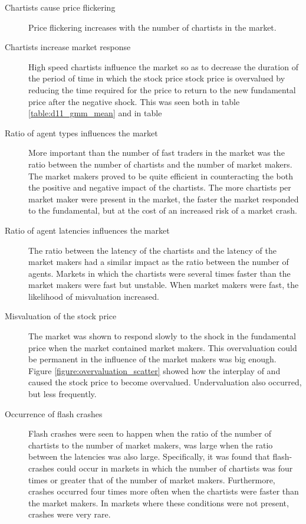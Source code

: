 \begin{description}
\item[Chartists cause price flickering] Price flickering increases with the number of chartists in the market.

\item[Chartists increase market response] High speed chartists influence the market so as to decrease the duration of the period of time in which the stock price stock price is overvalued by reducing the time required for the price to return to the new fundamental price after the negative shock. This was seen both in table \ref{table:d11_gmm_mean} and in table 

\item[Ratio of agent types influences the market] More important than the number of fast traders in the market was the ratio between the number of chartists and the number of market makers. The market makers proved to be quite efficient in counteracting the both the positive and negative impact of the chartists. The more chartists per market maker were present in the market, the faster the market responded to the fundamental, but at the cost of an increased risk of a market crash.
\item[Ratio of agent latencies influences the market] The ratio between the latency of the chartists and the latency of the market makers had a similar impact as the ratio between the number of agents. Markets in which the chartists were several times faster than the market makers were fast but unstable. When market makers were fast, the likelihood of misvaluation increased.

\item[Misvaluation of the stock price] The market was shown to respond slowly to the shock in the fundamental price when the market contained market makers. This overvaluation could be permanent in the influence of the market makers was big enough. Figure \ref{figure:overvaluation_scatter} showed how the interplay of \ssmmnAgents{} and \ssmmlatencymu{} caused the stock price to become overvalued. Undervaluation also occurred, but less frequently.
\item[Occurrence of flash crashes] Flash crashes were seen to happen when the ratio of the number of chartists to the number of market makers, \ratioagents{} was large when the ratio between the latencies \ratiolatency{} was also large. Specifically, it was found that flash-crashes could occur in markets in which  the number of chartists was four times or greater that of the number of market makers. Furthermore, crashes occurred four times more often when the chartists were faster than the market makers. In markets where these conditions were not present, crashes were very rare.
\end{description}







